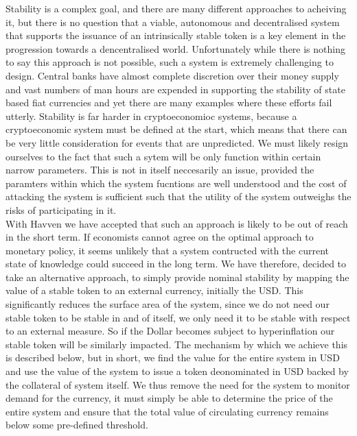 \noindent Stability is a complex goal, and there are many different approaches to acheiving it, but there is no question that a viable, autonomous and decentralised system that supports the issuance of an intrinsically stable token is a key element in the progression towards a dencentralised world. Unfortunately while there is nothing to say this approach is not possible, such a system is extremely challenging to design. Central banks have almost complete discretion over their money supply and vast numbers of man hours are expended in supporting the stability of state based fiat currencies and yet there are many examples where these efforts fail utterly. Stability is far harder in cryptoeconomioc systems, because a cryptoeconomic system must be defined at the start, which means that there can be very little consideration for events that are unpredicted. We must likely resign ourselves to the fact that such a sytem will be only function within certain narrow parameters. This is not in itself neccesarily an issue, provided the paramters within which the system fucntions are well understood and the cost of attacking the system is sufficient such that the utility of the system outweighs the risks of participating in it. \\

\noindent With Havven we have accepted that such an approach is likely to be out of reach in the short term. If economists cannot agree on the optimal approach to monetary policy, it seems unlikely that a system contructed with the current state of knowledge could succeed in the long term. We have therefore, decided to take an alternative approach, to simply provide nominal stability by mapping the value of a stable token to an external currency, initially the USD. This significantly reduces the surface area of the system, since we do not need our stable token to be stable in and of itself, we only need it to be stable with respect to an external measure. So if the Dollar becomes subject to hyperinflation our stable token will be similarly impacted. The mechanism by which we achieve this is described below, but in short, we find the value for the entire system in USD and use the value of the system to issue a token deonominated in USD backed by the collateral of system itself. We thus remove the need for the system to monitor demand for the currency, it must simply be able to determine the price of the entire system and ensure that the total value of circulating currency remains below some pre-defined threshold.\\

